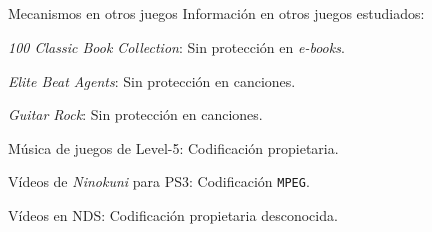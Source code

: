 \subsection{}
\begin{frame}{Mecanismos en otros juegos}
Información en otros juegos estudiados:

\begin{wideitemize}
    \item<+-> \textit{100 Classic Book Collection}: Sin protección en \textit{e-books}. \textcolor{BrickRed}{}

    \item<+-> \textit{Elite Beat Agents}: Sin protección en canciones. \textcolor{BrickRed}{}

    \item<+-> \textit{Guitar Rock}: Sin protección en canciones. \textcolor{BrickRed}{}

    \item<+-> Música de juegos de Level-5: Codificación propietaria. \textcolor{OliveGreen}{}

    \item<+-> Vídeos de \textit{Ninokuni} para PS3: Codificación \texttt{MPEG}. \textcolor{BrickRed}{}

    \item<+-> Vídeos en NDS: Codificación propietaria desconocida. \textcolor{OliveGreen}{}
\end{wideitemize}
\end{frame}
